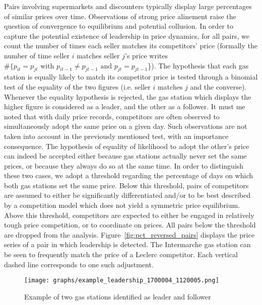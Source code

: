\documentclass[english]{article}
\begin{document}
Pairs involving supermarkets and discounters typically display large percentages of similar prices over time. Observations of strong price alinement raise the question of convergence to equilibrium and potential collusion. In order to capture the potential existence of leadership in price dynamics, for all pairs, we count the number of times each seller matches its competitors' price (formally the number of time seller $i$ matches seller $j$'s price writes $\#\{p_{it} = p_{jt} \text{ with } p_{it-1} \neq p_{jt-1} \text{ and } p_{jt} = p_{jt-1}$\}). The hypothesis that each gas station is equally likely to match its competitor price is tested through a binomial test of the equality of the two figures (i.e. seller $i$ matches $j$ and the converse). Whenever the equality hypothesis is rejected, the gas station which displays the higher figure is considered as a leader, and the other as a follower. It must me noted that with daily price records, competitors are often observed to simultaneously adopt the same price on a given day. Such observations are not taken into account in the previously mentioned test, with an importance consequence. The hypothesis of equality of likelihood to adopt the other's price can indeed be accepted either because gas stations actually never set the same prices, or because they always do so at the same time. In order to distinguish these two cases, we adopt a threshold regarding the percentage of days on which both gas stations set the same price. Below this threshold, pairs of competitors are assumed to either be significantly differentiated and/or to be best described by a competition model which does not yield a symmetric price equilibrium. Above this threshold, competitors are expected to either be engaged in relatively tough price competition, or to coordinate on prices. All pairs below the threshold are dropped from the analysis. Figure~\ref{fig:pct_reversed_pairs} displays the price series of a pair in which leadership is detected. The Intermarche gas station can be seen to frequently match the price of a Leclerc competitor. Each vertical dashed line corresponds to one such adjustment.

\begin{figure}[htb!]
    \caption{Example of two gas stations identified as leader and follower}
	\centering
		\texttt{[image: graphs/example\_leadership\_1700004\_1120005.png]}
\label{fig:leader_pair_example}
\end{figure}
\end{document}

